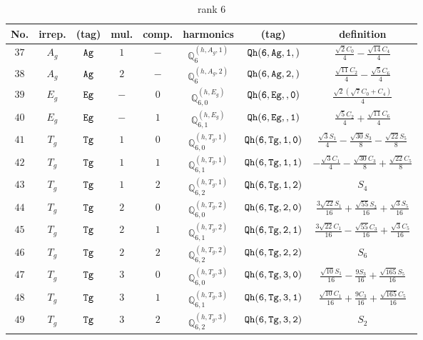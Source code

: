 \documentclass[fleqn,8pt]{jsarticle}
\begin{document}
\begin{table}[ht!]
\begin{center}
\caption{rank 6}
\renewcommand{\arraystretch}{1.3}
\begin{tabular}{cccccccc} \hline \hline
No. & irrep. & (tag) & mul. & comp. & harmonics & (tag) & definition \\ \hline
$ 37 $ & $ A_{g} $ & $ {\tt Ag} $ & $ 1 $ & $ - $ & $ \mathbb{Q}_{6}^{(h,A_{g},1)} $ & $ {\tt Qh(6,Ag,1,)} $ & $ \frac{\sqrt{2} C_{0}}{4} - \frac{\sqrt{14} C_{4}}{4} $ \\
$ 38 $ & $ A_{g} $ & $ {\tt Ag} $ & $ 2 $ & $ - $ & $ \mathbb{Q}_{6}^{(h,A_{g},2)} $ & $ {\tt Qh(6,Ag,2,)} $ & $ \frac{\sqrt{11} C_{2}}{4} - \frac{\sqrt{5} C_{6}}{4} $ \\
$ 39 $ & $ E_{g} $ & $ {\tt Eg} $ & $ - $ & $ 0 $ & $ \mathbb{Q}_{6,0}^{(h,E_{g})} $ & $ {\tt Qh(6,Eg,,0)} $ & $ \frac{\sqrt{2} \left(\sqrt{7} C_{0} + C_{4}\right)}{4} $ \\
$ 40 $ & $ E_{g} $ & $ {\tt Eg} $ & $ - $ & $ 1 $ & $ \mathbb{Q}_{6,1}^{(h,E_{g})} $ & $ {\tt Qh(6,Eg,,1)} $ & $ \frac{\sqrt{5} C_{2}}{4} + \frac{\sqrt{11} C_{6}}{4} $ \\
$ 41 $ & $ T_{g} $ & $ {\tt Tg} $ & $ 1 $ & $ 0 $ & $ \mathbb{Q}_{6,0}^{(h,T_{g},1)} $ & $ {\tt Qh(6,Tg,1,0)} $ & $ \frac{\sqrt{3} S_{1}}{4} - \frac{\sqrt{30} S_{3}}{8} - \frac{\sqrt{22} S_{5}}{8} $ \\
$ 42 $ & $ T_{g} $ & $ {\tt Tg} $ & $ 1 $ & $ 1 $ & $ \mathbb{Q}_{6,1}^{(h,T_{g},1)} $ & $ {\tt Qh(6,Tg,1,1)} $ & $ - \frac{\sqrt{3} C_{1}}{4} - \frac{\sqrt{30} C_{3}}{8} + \frac{\sqrt{22} C_{5}}{8} $ \\
$ 43 $ & $ T_{g} $ & $ {\tt Tg} $ & $ 1 $ & $ 2 $ & $ \mathbb{Q}_{6,2}^{(h,T_{g},1)} $ & $ {\tt Qh(6,Tg,1,2)} $ & $ S_{4} $ \\
$ 44 $ & $ T_{g} $ & $ {\tt Tg} $ & $ 2 $ & $ 0 $ & $ \mathbb{Q}_{6,0}^{(h,T_{g},2)} $ & $ {\tt Qh(6,Tg,2,0)} $ & $ \frac{3 \sqrt{22} S_{1}}{16} + \frac{\sqrt{55} S_{3}}{16} + \frac{\sqrt{3} S_{5}}{16} $ \\
$ 45 $ & $ T_{g} $ & $ {\tt Tg} $ & $ 2 $ & $ 1 $ & $ \mathbb{Q}_{6,1}^{(h,T_{g},2)} $ & $ {\tt Qh(6,Tg,2,1)} $ & $ \frac{3 \sqrt{22} C_{1}}{16} - \frac{\sqrt{55} C_{3}}{16} + \frac{\sqrt{3} C_{5}}{16} $ \\
$ 46 $ & $ T_{g} $ & $ {\tt Tg} $ & $ 2 $ & $ 2 $ & $ \mathbb{Q}_{6,2}^{(h,T_{g},2)} $ & $ {\tt Qh(6,Tg,2,2)} $ & $ S_{6} $ \\
$ 47 $ & $ T_{g} $ & $ {\tt Tg} $ & $ 3 $ & $ 0 $ & $ \mathbb{Q}_{6,0}^{(h,T_{g},3)} $ & $ {\tt Qh(6,Tg,3,0)} $ & $ \frac{\sqrt{10} S_{1}}{16} - \frac{9 S_{3}}{16} + \frac{\sqrt{165} S_{5}}{16} $ \\
$ 48 $ & $ T_{g} $ & $ {\tt Tg} $ & $ 3 $ & $ 1 $ & $ \mathbb{Q}_{6,1}^{(h,T_{g},3)} $ & $ {\tt Qh(6,Tg,3,1)} $ & $ \frac{\sqrt{10} C_{1}}{16} + \frac{9 C_{3}}{16} + \frac{\sqrt{165} C_{5}}{16} $ \\
$ 49 $ & $ T_{g} $ & $ {\tt Tg} $ & $ 3 $ & $ 2 $ & $ \mathbb{Q}_{6,2}^{(h,T_{g},3)} $ & $ {\tt Qh(6,Tg,3,2)} $ & $ S_{2} $ \\
 \hline \hline
\end{tabular}
\end{center}
\end{table}
\end{document}
